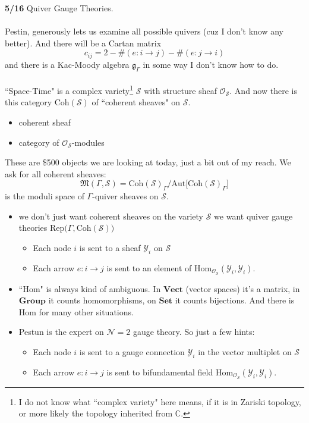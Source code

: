 \documentclass[12pt]{article}
\begin{document}
\noindent \textbf{5/16} Quiver Gauge Theories. \\ \\
Pestin, generously lets us examine all possible quivers (cuz I don't know any better).  And there will be a Cartan matrix 
$$ c_{ij} = 2 - \# (e: i \to j) - \# (e: j \to i)$$
and there is a Kac-Moody algebra $\mathfrak{g}_\Gamma$ in some way I don't know how to do. \\ \\
``Space-Time" is a complex variety\footnote{I do not know what ``complex variety" here means, if it is in Zariski topology, or more likely the topology inherited from $\mathbb{C}$.} $\mathcal{S}$ with structure sheaf $\mathcal{O}_\mathcal{S}$.   And now there is this category $\text{Coh}(\mathcal{S})$ of ``coherent sheaves" on $\mathcal{S}$. 
\begin{itemize}
\item coherent sheaf
\item category of $\mathcal{O}_\mathcal{S}$-modules
\end{itemize} 
These are \$500 objects we are looking at today, just a bit out of my reach. We ask for all coherent sheaves:
$$ \mathfrak{M}(\Gamma, \mathcal{S}) = \text{Coh}(\mathcal{S})_\Gamma / \text{Aut}\big[\text{Coh}(\mathcal{S})_\Gamma \big] $$
is the moduli space of $\Gamma$-quiver sheaves on $\mathcal{S}$. 
\begin{itemize}
\item we don't just want coherent sheaves on the variety $\mathcal{S}$ we want {\color{red!50!yellow}quiver gauge theories} $\text{Rep}\big(\Gamma, \text{Coh}(\mathcal{S})\big)$ 
\begin{itemize}
\item Each node $i$ is sent to a sheaf $\mathcal{Y}_i$ on $\mathcal{S}$
\item Each arrow $e: i \to j$ is sent to an element of $\text{Hom}_{\mathcal{O}_\mathcal{S}}(\mathcal{Y}_i, \mathcal{Y}_i)$.
\end{itemize}
\item ``Hom" is always kind of ambiguous.  In $\textbf{Vect}$ (vector spaces) it's a matrix, in $\textbf{Group}$ it counts homomorphisms, on $\textbf{Set}$ it counts bijections.  And there is Hom for many other situations.
\item Pestun is the expert on $\mathcal{N}=2$ gauge theory.  So just a few hints:
\begin{itemize}
\item Each node $i$ is sent to a {\color{red!50!green}gauge connection} $\mathcal{Y}_i$ in the {\color{red!30!green}vector multiplet}  on $\mathcal{S}$
\item Each arrow $e: i \to j$ is sent to {\color{red!70!green}bifundamental field} $\text{Hom}_{\mathcal{O}_\mathcal{S}}(\mathcal{Y}_i, \mathcal{Y}_i)$.
\end{itemize}
\end{itemize}
\end{document}

